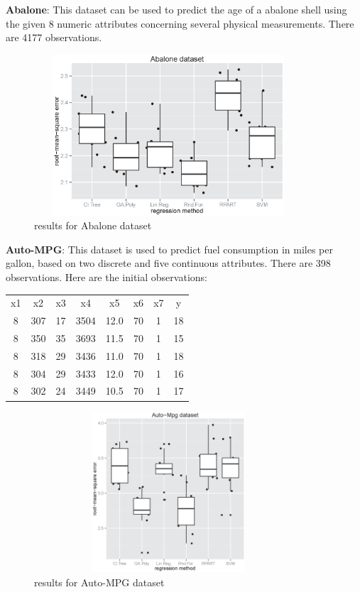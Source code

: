 \documentclass[a4paper, 12pt]{article}
\begin{document}
\textbf{Abalone}: This dataset can be used to predict the age of a abalone shell using the given 8 numeric attributes concerning several physical measurements. There are 4177 observations.

\begin{figure}[htb]
	\begin{center}
		\includegraphics[height=6cm,width=10cm,angle=0]
			{figures/Abalone_dataset_lambda1.0.eps}
		\caption{results for Abalone dataset}
	\end{center}
\end{figure}

\textbf{Auto-MPG}: This dataset is used to predict fuel consumption in miles per gallon, based on two discrete and five continuous attributes. There are 398 observations. Here are the initial observations:

\begin{center}
\begin{tabular}{cccccccc}
x1 & x2 & x3 & x4 & x5 & x6 & x7 & y \\
8 & 307 & 17 & 3504 & 12.0 & 70 & 1 & 18 \\
8 & 350 & 35 & 3693 & 11.5 & 70 & 1 & 15 \\
8 & 318 & 29 & 3436 & 11.0 & 70 & 1 & 18 \\
8 & 304 & 29 & 3433 & 12.0 & 70 & 1 & 16 \\
8 & 302 & 24 & 3449 & 10.5 & 70 & 1 & 17 
\end{tabular}
\end{center}

\begin{figure}[htb]
	\begin{center}
		\includegraphics[height=6cm,width=10cm,angle=0]
			{figures/Auto-Mpg_dataset_lambda0.8.eps}
		\caption{results for Auto-MPG dataset}
	\end{center}
\end{figure}
\end{document}
